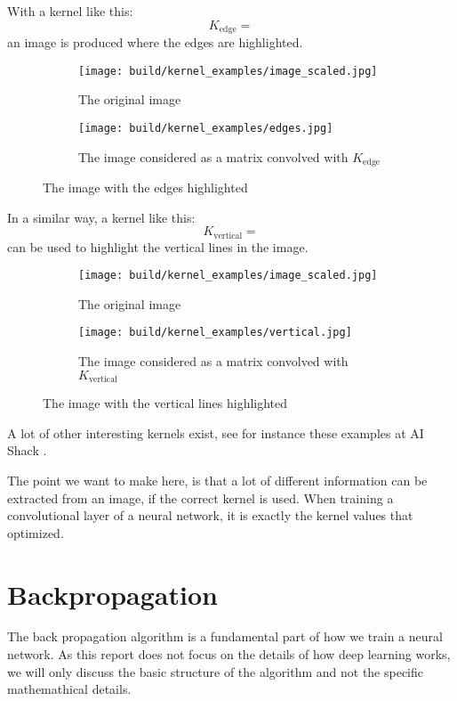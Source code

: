 With a kernel like this:
\begin{equation}
    K_{\text{edge}} =  
\end{equation}
an image is produced where the edges are highlighted.

\begin{figure}[ht]
\centering
\begin{subfigure}{0.45\textwidth}
    \texttt{[image: build/kernel\_examples/image\_scaled.jpg]}
    \caption{The original image}
\end{subfigure}
\begin{subfigure}{0.45\textwidth}
    \texttt{[image: build/kernel\_examples/edges.jpg]}
    \caption{The image considered as a matrix convolved with $K_{\text{edge}}$}
\end{subfigure}
\caption{The image with the edges highlighted}
\end{figure}

In a similar way, a kernel like this:
\begin{equation}
    K_{\text{vertical}} = 
\end{equation}
can be used to highlight the vertical lines in the image.

\begin{figure}[ht]
\centering
\begin{subfigure}{0.45\textwidth}
    \texttt{[image: build/kernel\_examples/image\_scaled.jpg]}
    \caption{The original image}
\end{subfigure}
\begin{subfigure}{0.45\textwidth}
    \texttt{[image: build/kernel\_examples/vertical.jpg]}
    \caption{The image considered as a matrix convolved with $K_{\text{vertical}}$}
\end{subfigure}
\caption{The image with the vertical lines highlighted}
\end{figure}

A lot of other interesting kernels exist, see for instance these examples at AI Shack \cite{kernel-example-webpage}.

The point we want to make here, is that a lot of different information can be extracted from an image,
if the correct kernel is used.
When training a convolutional layer of a neural network, it is exactly the kernel values that optimized.

\section{Backpropagation}
The back propagation algorithm is a fundamental part of how we train a neural network.
As this report does not focus on the details of how deep learning works, we will only discuss the
basic structure of the algorithm and not the specific mathemathical details.

